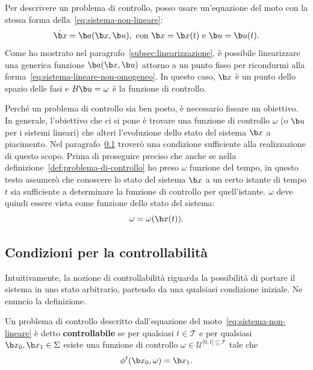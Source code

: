 Per descrivere un problema di controllo, posso usare un'equazione del moto con la stessa forma
della~\eqref{eq:sistema-non-lineare}:
\begin{equation*}
    \dot {\b x} = \b a(\b x, \b u),\ \text{con } \b x = \b x(t)\ \text e\ \b u = \b u(t).
\end{equation*}
Come ho mostrato nel paragrafo~\ref{subsec:linearizzazione}, è possibile linearizzare
una generica funzione $\b a(\b x, \b u)$ attorno a un punto fisso per ricondurmi alla
forma~\eqref{eq:sistema-lineare-non-omogeneo}.
In questo caso, $\b x$ è un punto dello spazio delle fasi e $B\b u = \omega$ è la funzione
di controllo.

Perché un problema di controllo sia ben posto, è necessario fissare un obiettivo.
In generale, l'obiettivo che ci si pone è trovare una funzione di controllo $\omega$
(o $\b u$ per i sistemi lineari) che alteri l'evoluzione dello stato del sistema $\b x$ a piacimento.
Nel paragrafo~\ref{subsec:condizioni-controllabilità} troverò una condizione sufficiente
alla realizzazione di questo scopo.
Prima di proseguire preciso che anche se nella definizione~\ref{def:problema-di-controllo}
ho preso $\omega$ funzione del tempo,
in questo testo assumerò che conoscere lo stato del sistema $\b x$
a un certo istante di tempo $t$ sia sufficiente a determinare la funzione di controllo
per quell'istante. $\omega$ deve quindi essere vista come funzione dello stato
del sistema:
\begin{equation*}
    \omega = \omega(\b x(t)).
\end{equation*}

\subsection{Condizioni per la controllabilità}
\label{subsec:condizioni-controllabilità}
Intuitivamente, la nozione di controllabilità riguarda la possibilità di portare il sistema
in uno stato arbitrario, partendo da una qualsiasi condizione iniziale.
Ne enuncio la definizione.
\begin{definition}
    Un problema di controllo descritto dall'equazione del moto~\ref{eq:sistema-non-lineare}
    è detto \textbf{controllabile} se per qualsiasi $t \in \mathcal T$ e per qualsiasi $\b x_0, \b x_1 \in \Sigma$
    esiste una funzione di controllo $\omega \in  \mathcal U^{[0, t[ \subseteq \mathcal T}$ tale che
    \begin{equation*}
        \phi^t(\b x_0, \omega) = \b x_1.
    \end{equation*}
    \label{def:controllabilità}
\end{definition}

